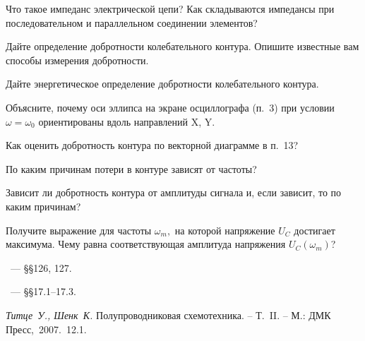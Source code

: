 \begin{lab:questions}
    \item Что такое импеданс электрической цепи?
    Как складываются импедансы при последовательном и параллельном
    соединении элементов?
    
     \item Дайте определение добротности колебательного контура.
     Опишите известные вам способы измерения добротности.
     
	\item Дайте энергетическое определение добротности колебательного контура.

	\item Объясните, почему оси эллипса на экране осциллографа (п.~3) при
условии $\omega=\omega_0$ ориентированы вдоль направлений X, Y.

	\item Как оценить добротность контура по векторной диаграмме в п.~13?

	\item По каким причинам потери в контуре зависят от частоты?

	\item *Зависит ли добротность контура от амплитуды сигнала и, если зависит,
то по каким причинам?

	\item *Получите выражение для частоты $\omega_m,$ на которой напряжение $U_C$
достигает максимума. Чему равна соответствующая амплитуда напряжения $U_C(\omega_m)$?
\end{lab:questions}


\begin{lab:literature}
    \item \SivuhinIII~--- \S\S126, 127.
    \item \Kirichenko~--- \S\S17.1--17.3.
	\item *\textit{Титце~У., Шенк~К.} Полупроводниковая схемотехника.  – Т.~II. –
М.: ДМК Пресс,~2007.~12.1.
\end{lab:literature}

